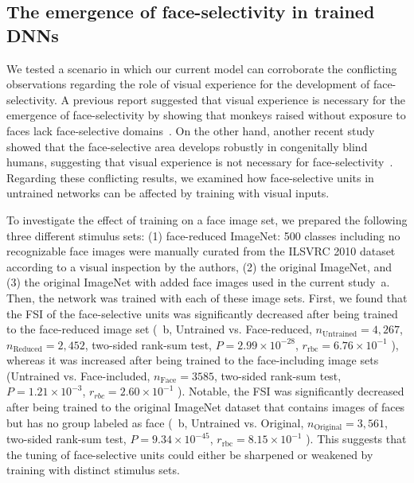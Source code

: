 \documentclass[sn-mathphys]{sn-jnl}%
\theoremstyle{thmstyleone}%
\theoremstyle{thmstyletwo}%
\theoremstyle{thmstylethree}%
\begin{document}
\subsection{The emergence of face-selectivity in trained DNNs}
We tested a scenario in which our current model can corroborate the conflicting observations regarding the role of visual experience for the development of face-selectivity.
A previous report suggested that visual experience is necessary for the emergence of face-selectivity by showing that monkeys raised without exposure to faces lack face-selective domains~\cite{arcaro2017seeing}.
On the other hand, another recent study showed that the face-selective area develops robustly in congenitally blind humans, suggesting that visual experience is not necessary for face-selectivity~\cite{arcaro2017seeing}.
Regarding these conflicting results, we examined how face-selective units in untrained networks can be affected by training with visual inputs.


To investigate the effect of training on a face image set,
we prepared the following three different stimulus sets:
(1) face-reduced ImageNet: 500 classes including no recognizable face images were manually curated from the ILSVRC 2010 dataset according to a visual inspection by the authors,
(2) the original ImageNet, 
and (3) the original ImageNet with added face images used in the current study~a.
Then, the network was trained with each of these image sets.
First, we found that the FSI of the face-selective units was significantly decreased after being trained to the face-reduced image set 
(~b,
Untrained vs. Face-reduced,
$ n_\textrm{Untrained} = 4,267 $,
$ n_\textrm{Reduced} = 2,452 $,
two-sided rank-sum test,
$ P = 2.99 \times 10^{-28} $,
$ r_\textrm{rbc} = 6.76 \times 10^{-1} $
),
whereas it was increased after being trained to the face-including image sets 
(Untrained vs. Face-included,
$ n_\textrm{Face} =3585 $,
two-sided rank-sum test,
$ P = 1.21 \times 10^{-3} $,
$ r_{rbc} = 2.60 \times 10^{-1} $
).
Notable, the FSI was significantly decreased after being trained to the original ImageNet dataset that contains images of faces but has no group labeled as face
(~b, Untrained vs. Original, 
$ n_\textrm{Original} = 3,561 $,
two-sided rank-sum test,
$ P = 9.34 \times 10^{-45} $,
$ r_\textrm{rbc} = 8.15 \times 10^{-1} $
).
This suggests that the tuning of face-selective units could either be sharpened or weakened by training with distinct stimulus sets.
\end{document}
